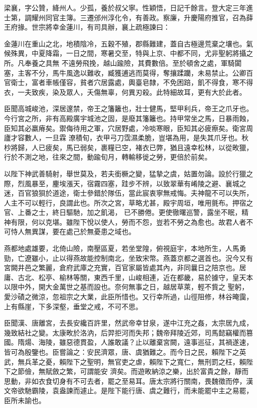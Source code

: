 \begin{pinyinscope}
 梁襄，字公贊，絳州人。少孤，養於叔父寧。性穎悟，日記千餘言。登大定三年進士第，調耀州同官主簿。三遷邠州淳化令，有善政。察廉，升慶陽府推官，召為薛王府掾。世宗將幸金蓮川，有司具辦，襄上疏極諫曰：



 金蓮川在重山之北，地積陰冷，五穀不殖，郡縣難建，蓋自古極邊荒棄之壤也。氣候殊異，中夏降霜，一日之間，寒暑交至，特與上京、中都不同，尤非聖躬將攝之所。凡奉養之具無
 不遠勞飛挽，越山踰險，其費數倍。至於頓舍之處，軍騎闐塞，主客不分，馬牛風逸以難收，臧獲逋逃而莫得，奪攘蹂躪，未易禁止。公卿百官衛士，富者車帳僅容，貧者穴居露處，輿臺皂隸，不免困踣，飢不得食，寒不得衣，一夫致疾，染及眾人，夭傷無辜，何異刃殺。此特細故耳，更有大於此者。



 臣聞高城峻池，深居邃禁，帝王之籓籬也，壯士健馬，堅甲利兵，帝王之爪牙也。今行宮之所，非有高殿廣宇城池之固，是廢其籓籬也。持甲常坐之馬，日暴雨蝕，臣知其必羸瘠矣。禦侮待用之軍，穴居野處，冷啖寒眼，臣知其必疲瘵矣。衛宮周廬才容數人，一旦霖
 潦積旬，衣甲弓刀霑濕柔脆，豈堪為用，是失其爪牙也。秋杪將歸，人已疲矣，馬已弱矣，裹糧已空，褚衣已弊，猶且遠幸松林，以從畋獵，行於不測之地，往來之間，動踰旬月，轉輸移徙之勞，更倍於前矣。



 以陛下神武善騎射，舉世莫及，若夫銜橛之變，猛摯之虞，姑置勿論。設於行獵之際，烈風暴至，麈埃漲天，宿霧四塞，跬步不辨，以致翠華有崤陵之避、襄城之迷，百官狼狽於道途，衛士參錯於隊伍，當此宸衷寧無戒悔。夫神龍不可以失所，人主不可以輕行，良謂此也。所次之宮，草略尤甚，殿宇周垣，唯用氈布。押宿之官、上番之士，終日驅馳，加之飢渴，
 已不勝倦。更使徹曙巡警，露坐不眠，精神有限，何以克堪。雖陛下悅以使人，勞而不怨，豈若不勞之為愈也。故君人者不可恃人無異謀，要在處己於無憂患之域也。



 燕都地處雄要，北倚山險，南壓區夏，若坐堂隍，俯視庭宇，本地所生，人馬勇勁，亡遼雖小，止以得燕故能控制南北，坐致宋幣。燕蓋京都之選首也。況今又有宮闕井邑之繁麗，倉府武庫之充實，百官家屬皆處其內，非同曩日之陪京也。居庸、古北、松亭、榆林等關，東西千里，山峻相連，近在都畿，易於據守，皇天本以限中外，開大金萬世之基而設也。奈何無事之日，越居草萊，輕不貲之
 聖躬，愛沙磧之微涼，忽祖宗之大業，此臣所惜也。又行幸所過，山徑阻修，林谷晻靄，上有縣崖，下多深壑，垂堂之戒，不可不思。



 臣聞漢、唐離宮，去長安纔百許里，然武帝幸甘泉，遂中江充之姦，太宗居九成，幾致結社之變。太康畋於洛汭，后羿拒河而失邦；魏帝拜陵近郊，司馬懿竊權而篡國。隋煬、海陵，雖惡德貫盈，人誰敢議？止以離棄宮闕，遠事巡征，其禍遂速，皆可為殷鑒也。臣嘗論之：安民濟眾，唐、虞猶難之。而今日之民，賴陛下之英武，無兵革之憂，賴陛下之聖明，無官吏之虐，賴陛下之寬仁，無刑罰之枉，賴陛下之節儉，無賦斂之繁，可謂能安
 濟矣。而遊畋納涼之樂，出於富貴之餘，靜而思動，非如衣食切身有不可去者，罷之至易耳。唐太宗將行關南，畏魏徵而停，漢文帝欲馳霸陵，袁盎諫而遽止。是陛下能行唐、虞之難行，而未能罷中主之易罷，臣所未諭也。




\end{pinyinscope}
